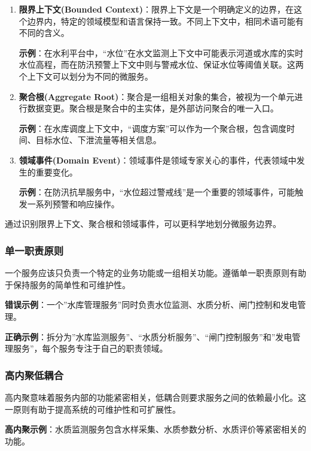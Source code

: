 \begin{enumerate}
\def\labelenumi{\arabic{enumi}.}
\item
  \textbf{限界上下文(Bounded
  Context)}：限界上下文是一个明确定义的边界，在这个边界内，特定的领域模型和语言保持一致。不同上下文中，相同术语可能有不同的含义。

  \textbf{示例}：在水利平台中，``水位''在水文监测上下文中可能表示河道或水库的实时水位高程，而在防汛预警上下文中则与警戒水位、保证水位等阈值关联。这两个上下文可以划分为不同的微服务。
\item
  \textbf{聚合根(Aggregate
  Root)}：聚合是一组相关对象的集合，被视为一个单元进行数据变更。聚合根是聚合中的主实体，是外部访问聚合的唯一入口。

  \textbf{示例}：在水库调度上下文中，``调度方案''可以作为一个聚合根，包含调度时间、目标水位、下泄流量等相关信息。
\item
  \textbf{领域事件(Domain
  Event)}：领域事件是领域专家关心的事件，代表领域中发生的重要变化。

  \textbf{示例}：在防汛抗旱服务中，``水位超过警戒线''是一个重要的领域事件，可能触发一系列预警和响应操作。
\end{enumerate}

通过识别限界上下文、聚合根和领域事件，可以更科学地划分微服务边界。

\subsubsection{单一职责原则}\label{ux5355ux4e00ux804cux8d23ux539fux5219}

一个服务应该只负责一个特定的业务功能或一组相关功能。遵循单一职责原则有助于保持服务的简单性和可维护性。

\textbf{错误示例}：一个''水库管理服务''同时负责水位监测、水质分析、闸门控制和发电管理。

\textbf{正确示例}：拆分为''水库监测服务''、``水质分析服务''、``闸门控制服务''和''发电管理服务''，每个服务专注于自己的职责领域。

\subsubsection{高内聚低耦合}\label{ux9ad8ux5185ux805aux4f4eux8026ux5408}

高内聚意味着服务内部的功能紧密相关，低耦合则要求服务之间的依赖最小化。这一原则有助于提高系统的可维护性和可扩展性。

\textbf{高内聚示例}：水质监测服务包含水样采集、水质参数分析、水质评价等紧密相关的功能。

